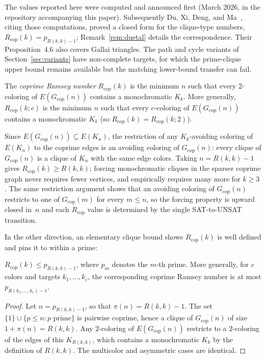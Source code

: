 \documentclass[12pt]{article}
\newcommand{\Rcop}{R_{\mathrm{cop}}}
\newcommand{\Gcop}{G_{\mathrm{cop}}}
\begin{document}
The values reported here were computed and announced first (March
2026, in the repository accompanying this paper). Subsequently Du,
Xi, Deng, and Ma~\cite{du2026prime}, citing those computations, proved
a closed form for the clique-type numbers,
$\Rcop(k)=p_{R(k,k)-1}$; Remark~\ref{rem:duetal} details the
correspondence. Their Proposition~4.6 also covers Gallai triangles.
The path and cycle variants of Section~\ref{sec:variants} have
non-complete targets, for which the prime-clique upper bound remains
available but the matching lower-bound transfer can fail.

\begin{definition}\label{def:rcop}
The \emph{coprime Ramsey number} $\Rcop(k)$ is the minimum $n$ such
that every $2$-coloring of $E(\Gcop(n))$ contains a monochromatic
$K_k$. More generally, $\Rcop(k;c)$ is the minimum $n$ such that every
$c$-coloring of $E(\Gcop(n))$ contains a monochromatic $K_k$ (so
$\Rcop(k) = \Rcop(k;2)$).
\end{definition}

Since $E(\Gcop(n))\subseteq E(K_n)$, the restriction of any
$K_k$-avoiding coloring of $E(K_n)$ to the coprime edges is an
avoiding coloring of $\Gcop(n)$: every clique of $\Gcop(n)$ is a
clique of $K_n$ with the same edge colors. Taking $n = R(k,k)-1$
gives $\Rcop(k)\ge R(k,k)$; forcing
monochromatic cliques in the sparser coprime graph never requires
fewer vertices, and empirically requires many more for $k \ge 3$.
The same restriction argument shows that an avoiding coloring of
$\Gcop(n)$ restricts to one of $\Gcop(m)$ for every $m \le n$, so the
forcing property is upward closed in~$n$ and each $\Rcop$ value is
determined by the single SAT-to-UNSAT transition.

In the other direction, an elementary clique bound shows
$\Rcop(k)$ is well defined and pins it to within a prime:

\begin{proposition}\label{prop:cone}
$\Rcop(k) \le p_{R(k,k)-1}$, where $p_m$ denotes the $m$-th prime.
More generally, for $c$ colors and targets $k_1,\ldots,k_c$, the
corresponding coprime Ramsey number is at most
$p_{R(k_1,\ldots,k_c)-1}$.
\end{proposition}

\begin{proof}
Let $n = p_{R(k,k)-1}$, so that $\pi(n) = R(k,k)-1$. The set
$\{1\} \cup \{p \le n : p \text{ prime}\}$ is pairwise coprime, hence
a clique of $\Gcop(n)$ of size $1 + \pi(n) = R(k,k)$. Any
$2$-coloring of $E(\Gcop(n))$ restricts to a $2$-coloring of the
edges of this $K_{R(k,k)}$, which contains a monochromatic $K_k$ by
the definition of $R(k,k)$. The multicolor and asymmetric cases are
identical.
\end{proof}
\end{document}
